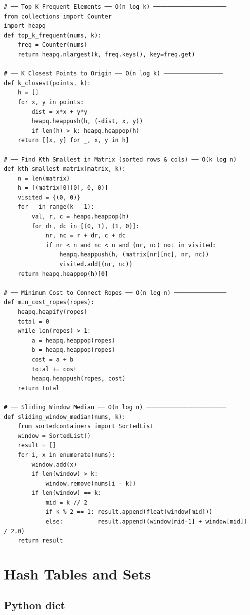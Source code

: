 \documentclass[11pt,a4paper]{report}
\begin{document}
\begin{lstlisting}
# ── Top K Frequent Elements ── O(n log k) ─────────────────────
from collections import Counter
import heapq
def top_k_frequent(nums, k):
    freq = Counter(nums)
    return heapq.nlargest(k, freq.keys(), key=freq.get)

# ── K Closest Points to Origin ── O(n log k) ─────────────────
def k_closest(points, k):
    h = []
    for x, y in points:
        dist = x*x + y*y
        heapq.heappush(h, (-dist, x, y))
        if len(h) > k: heapq.heappop(h)
    return [[x, y] for _, x, y in h]

# ── Find Kth Smallest in Matrix (sorted rows & cols) ── O(k log n)
def kth_smallest_matrix(matrix, k):
    n = len(matrix)
    h = [(matrix[0][0], 0, 0)]
    visited = {(0, 0)}
    for _ in range(k - 1):
        val, r, c = heapq.heappop(h)
        for dr, dc in [(0, 1), (1, 0)]:
            nr, nc = r + dr, c + dc
            if nr < n and nc < n and (nr, nc) not in visited:
                heapq.heappush(h, (matrix[nr][nc], nr, nc))
                visited.add((nr, nc))
    return heapq.heappop(h)[0]

# ── Minimum Cost to Connect Ropes ── O(n log n) ───────────────
def min_cost_ropes(ropes):
    heapq.heapify(ropes)
    total = 0
    while len(ropes) > 1:
        a = heapq.heappop(ropes)
        b = heapq.heappop(ropes)
        cost = a + b
        total += cost
        heapq.heappush(ropes, cost)
    return total

# ── Sliding Window Median ── O(n log n) ───────────────────────
def sliding_window_median(nums, k):
    from sortedcontainers import SortedList
    window = SortedList()
    result = []
    for i, x in enumerate(nums):
        window.add(x)
        if len(window) > k:
            window.remove(nums[i - k])
        if len(window) == k:
            mid = k // 2
            if k % 2 == 1: result.append(float(window[mid]))
            else:          result.append((window[mid-1] + window[mid]) / 2.0)
    return result
\end{lstlisting}

\chapter{Hash Tables and Sets}

\section{Python dict}
\end{document}
